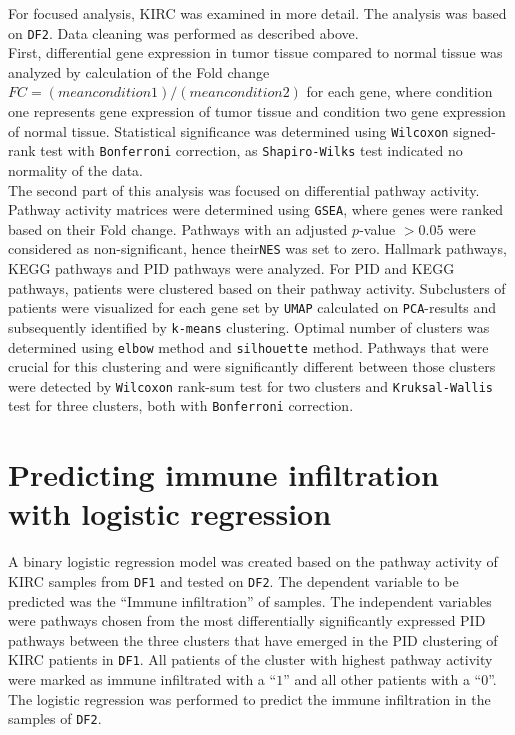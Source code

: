 \documentclass[
  parskip,
  oneside]{scrreprt}
\begin{document}
For focused analysis, KIRC was examined in more detail. The analysis was
based on \texttt{DF2}. Data cleaning was performed as described above.\\
First, differential gene expression in tumor tissue compared to normal
tissue was analyzed by calculation of the Fold change
\(FC =(mean condition 1) / (mean condition 2)\) for each gene, where
condition one represents gene expression of tumor tissue and condition
two gene expression of normal tissue. Statistical significance was
determined using \texttt{Wilcoxon} signed-rank test with
\texttt{Bonferroni} correction, as \texttt{Shapiro-Wilks} test indicated
no normality of the data.\\
The second part of this analysis was focused on differential pathway
activity. Pathway activity matrices were determined using \texttt{GSEA},
where genes were ranked based on their Fold change. Pathways with an
adjusted \(p\)-value \(>0.05\) were considered as non-significant, hence
their\texttt{NES} was set to zero. Hallmark pathways, KEGG pathways and
PID pathways were analyzed. For PID and KEGG pathways, patients were
clustered based on their pathway activity. Subclusters of patients were
visualized for each gene set by \texttt{UMAP} calculated on
\texttt{PCA}-results and subsequently identified by \texttt{k-means}
clustering. Optimal number of clusters was determined using
\texttt{elbow} method and \texttt{silhouette} method. Pathways that were
crucial for this clustering and were significantly different between
those clusters were detected by \texttt{Wilcoxon} rank-sum test for two
clusters and \texttt{Kruksal-Wallis} test for three clusters, both with
\texttt{Bonferroni} correction.

\hypertarget{predicting-immune-infiltration-with-logistic-regression}{%
\section{Predicting immune infiltration with logistic
regression}\label{predicting-immune-infiltration-with-logistic-regression}}

A binary logistic regression model was created based on the pathway
activity of KIRC samples from \texttt{DF1} and tested on \texttt{DF2}.
The dependent variable to be predicted was the ``Immune infiltration''
of samples. The independent variables were pathways chosen from the most
differentially significantly expressed PID pathways between the three
clusters that have emerged in the PID clustering of KIRC patients in
\texttt{DF1}. All patients of the cluster with highest pathway activity
were marked as immune infiltrated with a ``\(1\)'' and all other
patients with a ``\(0\)''. The logistic regression was performed to
predict the immune infiltration in the samples of \texttt{DF2}.
\end{document}
